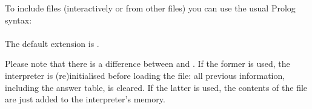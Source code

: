 
To include files (interactively or from other files) you can use the usual
Prolog syntax:\\
\ind
\prog{:-~[~}\prog{,~}\prog{,~}\prog{~].}\\
The default extension is .

Please note that there is a difference between
\prog{~)} and \prog{:-~[~}\prog{~].}.  If
the former is used, the interpreter is (re)initialised before loading the
file: all previous information, including the answer table, is cleared.  If
the latter is used, the contents of the file are just added to the
interpreter's memory.

%
